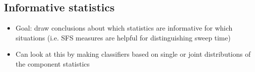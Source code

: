 \documentclass{article}
\begin{document}
\bigskip

\subsection{Informative statistics}
\begin{itemize}
\item Goal: draw conclusions about which statistics are informative for which situations (i.e. SFS measures are helpful for distinguishing sweep time)
\item Can look at this by making classifiers based on single or joint distributions of the component statistics
\end{itemize}
\end{document}
